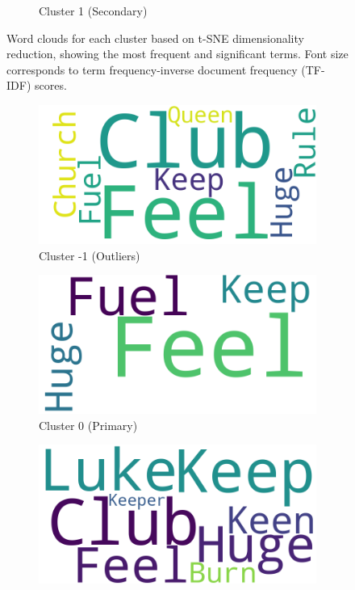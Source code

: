 \documentclass[conference]{IEEEtran}
\begin{document}
\begin{figure}[!t]
\begin{subfigure}[b]{0.3\textwidth}
    \caption{Cluster 1 (Secondary)}
\end{subfigure}
\caption{Word clouds for each cluster based on t-SNE dimensionality reduction, showing the most frequent and significant terms. Font size corresponds to term frequency-inverse document frequency (TF-IDF) scores.}
\label{fig:wordcloud-tsne}
\end{figure}

\begin{figure}[!t]
\centering
\begin{subfigure}[b]{0.3\textwidth}
    \includegraphics[width=\textwidth]{images/world_cloud_cluster_m1_umap}
    \caption{Cluster -1 (Outliers)}
\end{subfigure}
\begin{subfigure}[b]{0.3\textwidth}
    \includegraphics[width=\textwidth]{images/word_cloud_cluster_0_umap}
    \caption{Cluster 0 (Primary)}
\end{subfigure}
\begin{subfigure}[b]{0.3\textwidth}
    \includegraphics[width=\textwidth]{images/world_cloud_cluster_1_umap}

\end{subfigure}
\end{figure}
\end{document}
